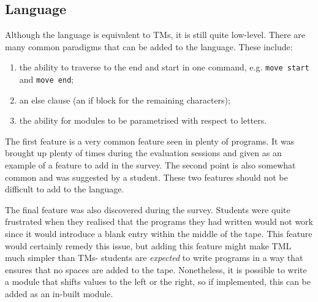 \subsection{Language}
Although the language is equivalent to TMs, it is still quite low-level. There are many common paradigms that can be added to the language. These include:
\begin{enumerate}
    \item the ability to traverse to the end and start in one command, e.g. \texttt{move start} and \texttt{move end};
    \item an else clause (an if block for the remaining characters); 
    \item the ability for modules to be parametrised with respect to letters.
\end{enumerate}
The first feature is a very common feature seen in plenty of programs. It was brought up plenty of times during the evaluation sessions and given as an example of a feature to add in the survey. The second point is also somewhat common and was suggested by a student. These two features should not be difficult to add to the language. 

The final feature was also discovered during the survey. Students were quite frustrated when they realised that the programs they had written would not work since it would introduce a blank entry within the middle of the tape. This feature would certainly remedy this issue, but adding this feature might make TML much simpler than TMs- students are \emph{expected} to write programs in a way that ensures that no spaces are added to the tape. Nonetheless, it is possible to write a module that shifts values to the left or the right, so if implemented, this can be added as an in-built module.



